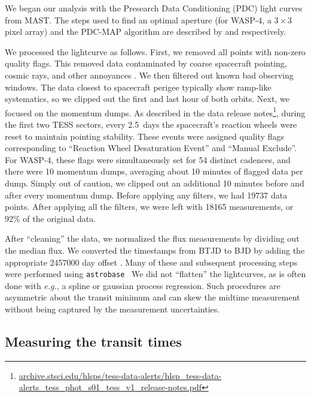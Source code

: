\documentclass[12pt,twocolumn,tighten]{aastex62}
\begin{document}
We began our analysis with the Presearch Data Conditioning (PDC) light
curves from MAST.  The steps used to find an optimal aperture (for
WASP-4, a $3\times 3$ pixel array) and the PDC-MAP algorithm are
described by \citet{smith_kepler_apertures_2017} and
\citet{smith_kepler_PDC_2017} respectively.

We processed the lightcurve as follows.  First, we removed all
points with non-zero quality flags.  This removed data contaminated by
coarse spacecraft pointing, cosmic rays, and other annoyances
\citep{tess_data_product_description_2018}.  We then filtered out
known bad observing windows.  The data closest to spacecraft perigee
typically show ramp-like systematics, so we clipped out the first and
last hour of both orbits.  Next, we focused on the momentum dumps. As
described in the data release
notes\footnote{\url{archive.stsci.edu/hlsps/tess-data-alerts/hlsp_tess-data-alerts_tess_phot_s01_tess_v1_release-notes.pdf}},
during the first two TESS sectors, every 2.5~days the spacecraft's
reaction wheels were reset to maintain pointing stability.  These
events were assigned quality flags corresponding to ``Reaction Wheel
Desaturation Event'' and ``Manual Exclude''.  For WASP-4, these flags
were simultaneously set for 54 distinct cadences, and there were 10
momentum dumps, averaging about 10 minutes of flagged data per dump.
Simply out of caution, we clipped out an additional 10 minutes before
and after every momentum dump.  Before applying any filters, we had
19737 data points. After applying all the filters, we were left with
18165 measurements, or 92\% of the original data.

After ``cleaning'' the data, we normalized the flux measurements by
dividing out the median flux.  We converted the timestamps from BTJD
to BJD by adding the appropriate 2457000 day offset
\citep{tess_data_product_description_2018}.  Many of these and
subsequent processing steps were performed using
\texttt{astrobase}~\citep{bhatti_astrobase_2018} We did not
``flatten'' the lightcurves, as is often done with {\it
e.g.}, a spline or gaussian process regression.  Such procedures are
asymmetric about the transit minimum and can skew the midtime
measurement without being captured by the measurement uncertainties.



\subsection{Measuring the transit times}
\label{sec:measurement}
\end{document}
